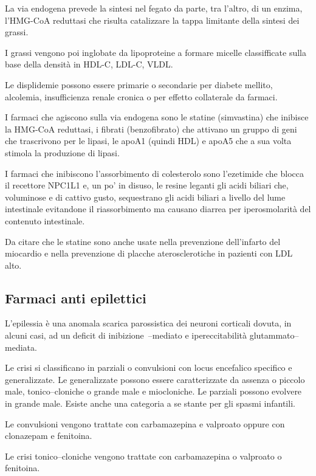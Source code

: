 La via endogena prevede la sintesi nel fegato da parte, tra l'altro, di un enzima, l'HMG-CoA reduttasi che risulta catalizzare la tappa limitante della sintesi dei grassi.

I grassi vengono poi inglobate da lipoproteine a formare micelle classifficate sulla base della densità in HDL-C, LDL-C, VLDL.

Le displidemie possono essere primarie o secondarie per diabete mellito, alcolemia, insufficienza renale cronica o per effetto collaterale da farmaci.

I farmaci che agiscono sulla via endogena sono le statine (simvastina) che inibisce la HMG-CoA reduttasi, i fibrati (benzofibrato) che attivano un gruppo di geni che trascrivono per le lipasi, le apoA1 (quindi HDL) e apoA5 che a sua volta stimola la produzione di lipasi.

I farmaci che inibiscono l'assorbimento di colesterolo sono l'ezetimide che blocca il recettore NPC1L1 e, un po' in disuso, le resine leganti gli acidi biliari che, voluminose e di cattivo gusto, sequestrano gli acidi biliari a livello del lume intestinale evitandone il riassorbimento ma causano diarrea per iperosmolarità del contenuto intestinale.

Da citare che le statine sono anche usate nella prevenzione dell'infarto del miocardio e nella prevenzione di placche aterosclerotiche in pazienti con LDL alto.

\subsection{Farmaci anti epilettici}

L'epilessia è una anomala scarica parossistica dei neuroni corticali dovuta, in alcuni casi, ad un deficit di inibizione~--mediato e ipereccitabilità glutammato--mediata.

Le crisi si classificano in parziali o convulsioni con locus encefalico specifico e generalizzate. Le generalizzate possono essere caratterizzate da assenza o piccolo male, tonico--cloniche o grande male e miocloniche. Le parziali possono evolvere in grande male. Esiste anche una categoria a se stante per gli spasmi infantili.

Le convulsioni vengono trattate con carbamazepina e valproato oppure con clonazepam e fenitoina. 

Le crisi tonico--cloniche vengono trattate con carbamazepina o valproato o fenitoina.

